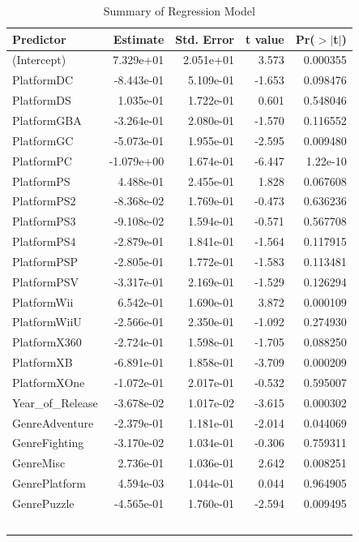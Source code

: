 \documentclass[12pt]{article}
\begin{document}
\begin{table}[ht]
  \caption{Summary of Regression Model}
  \label{tab:sl}
\centering
\begin{tabular}{lrrrr}
\hline
Predictor & Estimate & Std. Error & t value & Pr($>$$|$t$|$) \\ 
\hline
(Intercept) & 7.329e+01 & 2.051e+01 & 3.573 & 0.000355 \\
PlatformDC & -8.443e-01 & 5.109e-01 & -1.653 & 0.098476 \\
PlatformDS & 1.035e-01 & 1.722e-01 & 0.601 & 0.548046 \\
PlatformGBA & -3.264e-01 & 2.080e-01 & -1.570 & 0.116552 \\
PlatformGC & -5.073e-01 & 1.955e-01 & -2.595 & 0.009480 \\
PlatformPC & -1.079e+00 & 1.674e-01 & -6.447 & 1.22e-10 \\
PlatformPS & 4.488e-01 & 2.455e-01 & 1.828 & 0.067608 \\
PlatformPS2 & -8.368e-02 & 1.769e-01 & -0.473 & 0.636236 \\
PlatformPS3 & -9.108e-02 & 1.594e-01 & -0.571 & 0.567708 \\
PlatformPS4 & -2.879e-01 & 1.841e-01 & -1.564 & 0.117915 \\
PlatformPSP & -2.805e-01 & 1.772e-01 & -1.583 & 0.113481 \\
PlatformPSV & -3.317e-01 & 2.169e-01 & -1.529 & 0.126294 \\
PlatformWii & 6.542e-01 & 1.690e-01 & 3.872 & 0.000109 \\
PlatformWiiU & -2.566e-01 & 2.350e-01 & -1.092 & 0.274930 \\
PlatformX360 & -2.724e-01 & 1.598e-01 & -1.705 & 0.088250 \\
PlatformXB & -6.891e-01 & 1.858e-01 & -3.709 & 0.000209 \\
PlatformXOne & -1.072e-01 & 2.017e-01 & -0.532 & 0.595007 \\
Year\_of\_Release & -3.678e-02 & 1.017e-02 & -3.615 & 0.000302 \\
GenreAdventure & -2.379e-01 & 1.181e-01 & -2.014 & 0.044069 \\
GenreFighting & -3.170e-02 & 1.034e-01 & -0.306 & 0.759311 \\
GenreMisc & 2.736e-01 & 1.036e-01 & 2.642 & 0.008251 \\
GenrePlatform & 4.594e-03 & 1.044e-01 & 0.044 & 0.964905 \\
GenrePuzzle & -4.565e-01 & 1.760e-01 & -2.594 & 0.009495 \\
$$
\end{tabular}
\end{table}
\end{document}
